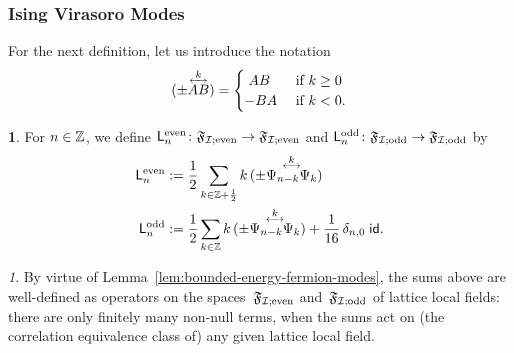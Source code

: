\documentclass[12pt,oneside,english]{amsart}
\numberwithin{equation}{section}
\numberwithin{figure}{section}
\theoremstyle{plain}
\theoremstyle{plain}
\theoremstyle{plain}
\theoremstyle{plain}
\theoremstyle{remark}
\newtheorem{rem}[thm]{\protect\remarkname}
\theoremstyle{definition}
\newtheorem{defn}[thm]{\protect\definitionname}
\theoremstyle{plain}
\theoremstyle{plain}
\numberwithin{thm}{section}
\providecommand{\definitionname}{Definition}
\providecommand{\remarkname}{Remark}
\providecommand{\definitionname}{Definition}
\providecommand{\remarkname}{Remark}
\providecommand{\definitionname}{Definition}
\providecommand{\remarkname}{Remark}
\providecommand{\definitionname}{Definition}
\providecommand{\remarkname}{Remark}
\begin{document}
\subsubsection{\label{subsec:ising-vir-modes}Ising Virasoro Modes}
For the next definition, let us introduce the notation
\[ \ourforder{A}{B}{k}
= \begin{cases}
  \; A B & \text{ if $k \geq 0$} \\
  - B A & \text{ if $k < 0$} .
  \end{cases}
\]
\begin{defn}
\label{def:ln-ising}
For $n \in \mathbb{Z}$, we define 
$\mathsf{L}_{n}^{\mathrm{even}}  \colon 
\mathfrak{F}_{\mathcal{I}; \mathrm{even}} \to \mathfrak{F}_{\mathcal{I}; \mathrm{even}}$
and $\mathsf{L}_{n}^{\mathrm{odd}}  \colon 
\mathfrak{F}_{\mathcal{I}; \mathrm{odd}} \to \mathfrak{F}_{\mathcal{I}; \mathrm{odd}}$
by 
\begin{align}
\virL{n}^{\abbrEven}
:= \; & \frac{1}{2} \sum_{k\in\Z +\frac{1}{2}} 
	k \, \ourforder{\fermmode_{n-k}}{\fermmode_{k}}{k} 
\label{eq:ln-ns-ising} \\
\virL{n}^{\abbrOdd}
:= \; & \frac{1}{2} \sum_{k\in\Z }
  k \, \ourforder{\fermmode_{n-k}}{\fermmode_{k}}{k}
  + \frac{1}{16} \, \delta_{n,0} \; \id .
\label{eq:ln-ram-ising}
\end{align}
\end{defn}
\begin{rem}
By virtue of Lemma~\ref{lem:bounded-energy-fermion-modes},
the sums above are well-defined as operators on the
spaces~$\mathfrak{F}_{\mathcal{I}; \mathrm{even}}$  and~$\mathfrak{F}_{\mathcal{I}; \mathrm{odd}}$
of lattice local fields: there are only finitely many non-null terms, when the 
sums act on (the correlation equivalence class of) any given
lattice local field.
\end{rem}
\end{document}

